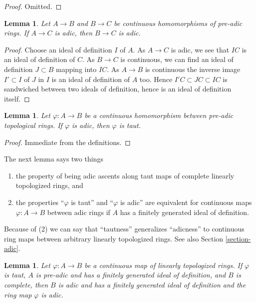 \documentclass{stacks-project}
\theoremstyle{plain}
\newtheorem{lemma}[subsection]{Lemma}
\theoremstyle{definition}
\theoremstyle{remark}
\numberwithin{equation}{subsection}
\begin{document}
\begin{proof}
Omitted.
\end{proof}

\begin{lemma}
\label{lemma-permanence-adic}
Let $A \to B$ and $B \to C$ be continuous homomorphisms of
pre-adic rings. If $A \to C$ is adic, then
$B \to C$ is adic.
\end{lemma}

\begin{proof}
Choose an ideal of definition $I$ of $A$. As $A \to C$ is adic, we
see that $IC$ is an ideal of definition of $C$.
As $B \to C$ is continuous, we can find an
ideal of definition $J \subset B$ mapping into $IC$.
As $A \to B$ is continuous the inverse image $I' \subset I$
of $J$ in $I$ is an ideal of definition of $A$ too.
Hence $I'C \subset JC \subset IC$ is sandwiched between
two ideals of definition, hence is an ideal of definition itself.
\end{proof}

\begin{lemma}
\label{lemma-adic-taut}
Let $\varphi : A \to B$ be a continuous homomorphism between
pre-adic topological rings. If $\varphi$ is adic, then $\varphi$ is taut.
\end{lemma}

\begin{proof}
Immediate from the definitions.
\end{proof}

\noindent
The next lemma says two things
\begin{enumerate}
\item the property of being adic ascents along taut maps
of complete linearly topologized rings, and
\item the properties ``$\varphi$ is taut'' and ``$\varphi$ is adic''
are equivalent for continuous maps $\varphi : A \to B$ between adic rings
if $A$ has a finitely generated ideal of definition.
\end{enumerate}
Because of (2) we can say that ``tautness'' generalizes ``adicness''
to continuous ring maps between arbitrary linearly topologized rings.
See also Section \ref{section-adic}.

\begin{lemma}
\label{lemma-taut-is-adic}
Let $\varphi : A \to B$ be a continuous map of linearly topologized rings.
If $\varphi$ is taut, $A$ is pre-adic and has a finitely generated ideal
of definition, and $B$ is complete, then $B$ is adic and has a finitely
generated ideal of definition and the ring map $\varphi$ is adic.
\end{lemma}
\end{document}
